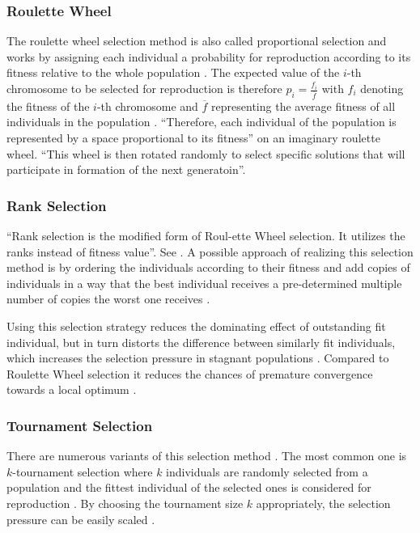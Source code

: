 \documentclass[sigconf]{acmart}
\begin{document}
\subsubsection{Roulette Wheel}
The roulette wheel selection method is also called proportional selection
and works by assigning each individual a probability for reproduction according
to its fitness relative to the whole population \cite{Affenzeller2009}.
The expected value of the $i$-th chromosome to be selected for reproduction
is therefore $p_i = \frac{f_i}{\overline{f}}$ with $f_i$ denoting the fitness
of the $i$-th chromosome and $\overline{f}$ representing the average fitness
of all individuals in the population \cite{Affenzeller2009}.
\enquote{Therefore, each individual of the population is represented by a
space proportional to its fitness}\cite{Affenzeller2009} on an imaginary
roulette wheel.
\enquote{This wheel is then rotated randomly to select specific solutions that
will participate in formation of the next generatoin}\cite{Katoch2021}.

\subsubsection{Rank Selection}
\enquote{Rank selection is the modified form of Roul-ette Wheel selection.
It utilizes the ranks instead of fitness value}.
See \cite{Affenzeller2009}.
A possible approach of realizing this selection method is by ordering the
individuals according to their fitness and add copies of individuals in a way
that the best individual receives a pre-determined multiple number of copies
the worst one receives \cite{Affenzeller2009}.

Using this selection strategy reduces the dominating effect of outstanding fit
individual, but in turn distorts the difference between similarly fit
individuals, which increases the selection pressure in stagnant populations
\cite{Affenzeller2009}.
Compared to Roulette Wheel selection it reduces the chances of premature
convergence towards a local optimum \cite{Katoch2021}.

\subsubsection{Tournament Selection}
There are numerous variants of this selection method \cite{Affenzeller2009}.
The most common one is $k$-tournament selection where $k$ individuals are
randomly selected from a population and the fittest individual of the selected
ones is considered for reproduction \cite{Affenzeller2009}.
By choosing the tournament size $k$ appropriately, the selection pressure
can be easily scaled \cite{Affenzeller2009}.
\end{document}

